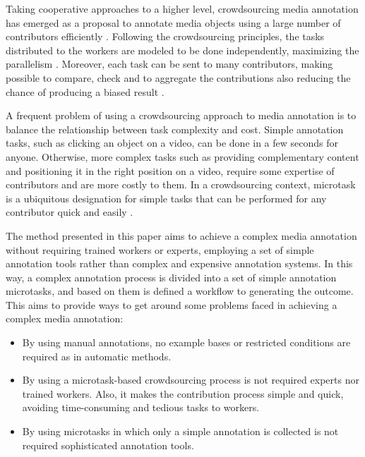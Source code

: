 Taking cooperative approaches to a higher level, crowdsourcing media annotation has emerged as a proposal to annotate media objects using a large number of contributors efficiently \cite{VonAhn:2005:HC:1168246}. Following the crowdsourcing principles, the tasks distributed to the workers are modeled to be done independently, maximizing the parallelism \citep{Howe2006}. Moreover, each task can be sent to many contributors, making possible to compare, check and to aggregate the contributions also reducing the chance of producing a biased result \cite{GALTON1907}.

A frequent problem of using a crowdsourcing approach to media annotation is to balance the relationship between task complexity and cost. Simple annotation tasks, such as clicking an object on a video, can be done in a few seconds for anyone. Otherwise, more complex tasks such as providing complementary content and positioning it in the right position on a video, require some expertise of contributors and are more costly to them. In a crowdsourcing context, microtask is a ubiquitous designation for simple tasks that can be performed for any contributor quick and easily \cite{Difallah:2015:DMC:2736277.2741685}.

The method presented in this paper aims to achieve a complex media annotation without requiring trained workers or experts, employing a set of simple annotation tools rather than complex and expensive annotation systems. In this way, a complex annotation process is divided into a set of simple annotation microtasks, and based on them is defined a workflow to generating the outcome. This aims to provide ways to get around some problems faced in achieving a complex media annotation:

\begin{itemize}

\item By using manual annotations, no example bases or restricted conditions are required as in automatic methods.

\item By using a microtask-based crowdsourcing process is not required experts nor trained workers. Also, it makes the contribution process simple and quick, avoiding time-consuming and tedious tasks to workers.

\item By using microtasks in which only a simple annotation is collected is not required sophisticated annotation tools.
\end{itemize}


